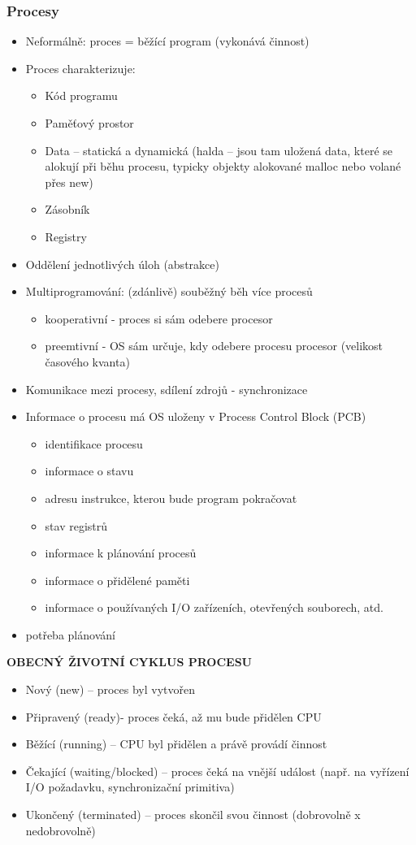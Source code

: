 \documentclass[10pt,a4paper]{article}
\begin{document}
\subsubsection{Procesy}
\begin{itemize}
	\item Neformálně: proces = běžící program (vykonává činnost)
	\item Proces charakterizuje:
	\begin{itemize}
		\item Kód programu
		\item Paměťový prostor
		\item Data – statická a dynamická (halda – jsou tam uložená data, které se alokují při běhu procesu, typicky objekty alokované malloc nebo volané přes new)
		\item Zásobník
		\item Registry
	\end{itemize}
	\item Oddělení jednotlivých úloh (abstrakce)
	\item Multiprogramování: (zdánlivě) souběžný běh více procesů
	\begin{itemize}
		\item kooperativní - proces si sám odebere procesor
		\item preemtivní - OS sám určuje, kdy odebere procesu procesor (velikost časového kvanta)
	\end{itemize}
	\item Komunikace mezi procesy, sdílení zdrojů - synchronizace
	\item Informace o procesu má OS uloženy v Process  Control Block (PCB)
	\begin{itemize}
		\item identifikace procesu
		\item informace o stavu
		\item adresu instrukce, kterou bude program pokračovat
		\item stav registrů
		\item informace k plánování procesů
		\item informace o přidělené paměti
		\item informace o používaných I/O zařízeních, otevřených souborech, atd.
	\end{itemize}
	\item potřeba plánování
\end{itemize}

\textbf{OBECNÝ ŽIVOTNÍ CYKLUS PROCESU}
\begin{itemize}
	\item Nový (new) – proces byl vytvořen
	\item Připravený (ready)- proces čeká, až mu bude přidělen CPU
	\item Běžící (running) – CPU byl přidělen a právě provádí činnost
	\item Čekající (waiting/blocked) – proces čeká na vnější událost (např. na vyřízení I/O požadavku, synchronizační primitiva)
	\item Ukončený (terminated) – proces skončil svou činnost (dobrovolně x nedobrovolně)
\end{itemize}
\end{document}
